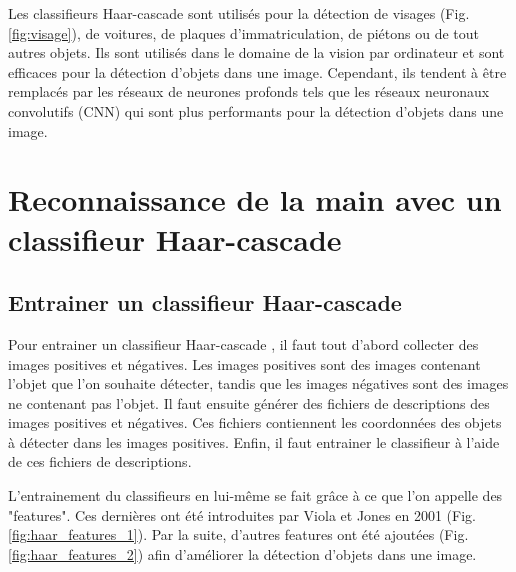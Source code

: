 \documentclass[11pt]{article}
\begin{document}
Les classifieurs Haar-cascade sont utilisés pour la détection de visages (Fig. \ref{fig:visage}), de voitures, de plaques d'immatriculation, de piétons ou de tout autres objets. Ils sont utilisés dans le domaine de la vision par ordinateur et sont efficaces pour la détection d'objets dans une image.
Cependant, ils tendent à être remplacés par les réseaux de neurones profonds tels que les réseaux neuronaux convolutifs (CNN) qui sont plus performants pour la détection d'objets dans une image.

\newpage

\section{Reconnaissance de la main avec un classifieur Haar-cascade}
\subsection{Entrainer un classifieur Haar-cascade}
Pour entrainer un classifieur Haar-cascade \cite{mittal_haar_2024}, il faut tout d'abord collecter des images positives et négatives. Les images positives sont des images contenant l'objet que l'on souhaite détecter, tandis que les images négatives sont des images ne contenant pas l'objet. Il faut ensuite générer des fichiers de descriptions des images positives et négatives. Ces fichiers contiennent les coordonnées des objets à détecter dans les images positives. Enfin, il faut entrainer le classifieur à l'aide de ces fichiers de descriptions. \bigbreak

L'entrainement du classifieurs en lui-même se fait grâce à ce que l'on appelle des "features". Ces dernières ont été introduites par Viola et Jones en 2001 (Fig. \ref{fig:haar_features_1}). Par la suite, d'autres features ont été ajoutées (Fig. \ref{fig:haar_features_2}) afin d'améliorer la détection d'objets dans une image.
\bigbreak \bigbreak
\end{document}
